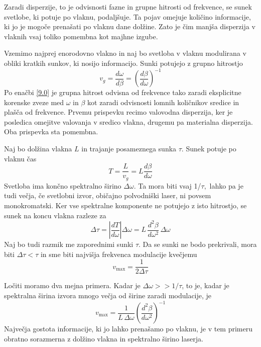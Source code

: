 \documentclass[11pt,fleqn]{book} %
\begin{document}
Zaradi disperzije, to je odvisnosti fazne in grupne hitrosti od frekvence,
se sunek svetlobe, ki potuje po vlaknu, podaljšuje. Ta pojav omejuje
količino informacije, ki jo je mogoče prenašati po vlaknu dane dolžine.
Zato je čim manjša disperzija v vlaknih vsaj toliko pomembna kot majhne
izgube.

Vzemimo najprej enorodovno vlakno in naj bo svetloba v vlaknu modulirana
v obliki kratkih sunkov, ki nosijo informacijo. Sunki potujejo z grupno
hitrostjo 
\begin{equation}
v_{g}=\frac{d\omega}{d\beta}=\left(\frac{d\beta}{d\omega}\right)^{-1}\label{9.51}
\end{equation}
 Po enačbi \ref{9.0} je grupna hitrost odvisna od frekvence tako
zaradi eksplicitne korenske zveze med $\omega$ in $\beta$ kot zaradi
odvisnosti lomnih količnikov sredice in plašča od frekvence. Prvemu
prispevku recimo valovodna disperzija, ker je posledica omejitve valovanja
v sredico vlakna, drugemu pa materialna disperzija. Oba prispevka
sta pomembna.

Naj bo dolžina vlakna $L$ in trajanje posameznega sunka $\tau$.
Sunek potuje po vlaknu čas 
\begin{equation}
T=\frac{L}{v_{g}}=L\frac{d\beta}{d\omega}\label{9.52}
\end{equation}
 Svetloba ima končno spektralno širino $\Delta\omega$. Ta mora biti
vsaj 1/$\tau,$ lahko pa je tudi večja, če svetlobni izvor, običajno
polvodniški laser, ni povsem monokromatski. Ker vse spektralne komponente
ne potujejo z isto hitrostjo, se sunek na koncu vlakna razleze za
\begin{equation}
\Delta\tau=\left|\frac{dT}{d\omega}\right|\Delta\omega=L\,\frac{d^{2}\beta}{d\omega^{2}}\,\Delta\omega\label{9.53}
\end{equation}
 Naj bo tudi razmik me zaporednimi sunki $\tau.$ Da se sunki ne bodo
prekrivali, mora biti $\Delta\tau<\tau$ in sme biti najvišja frekvenca
modulacije kvečjemu 
\begin{equation}
v_{\max}=\frac{1}{2\Delta\tau}\label{9.54}
\end{equation}


Ločiti moramo dva mejna primera. Kadar je $\Delta\omega>>1/\tau$,
to je, kadar je spektralna širina izvora mnogo večja od širine zaradi
modulacije, je 
\begin{equation}
v_{\max}=\frac{1}{L\,\Delta\omega}\left(\frac{d^{2}\beta}{d\omega^{2}}\right)^{-1}\label{9.55}
\end{equation}
 Največja gostota informacije, ki jo lahko prenašamo po vlaknu, je
v tem primeru obratno sorazmerna z dolžino vlakna in spektralno širino
laserja.
\end{document}
